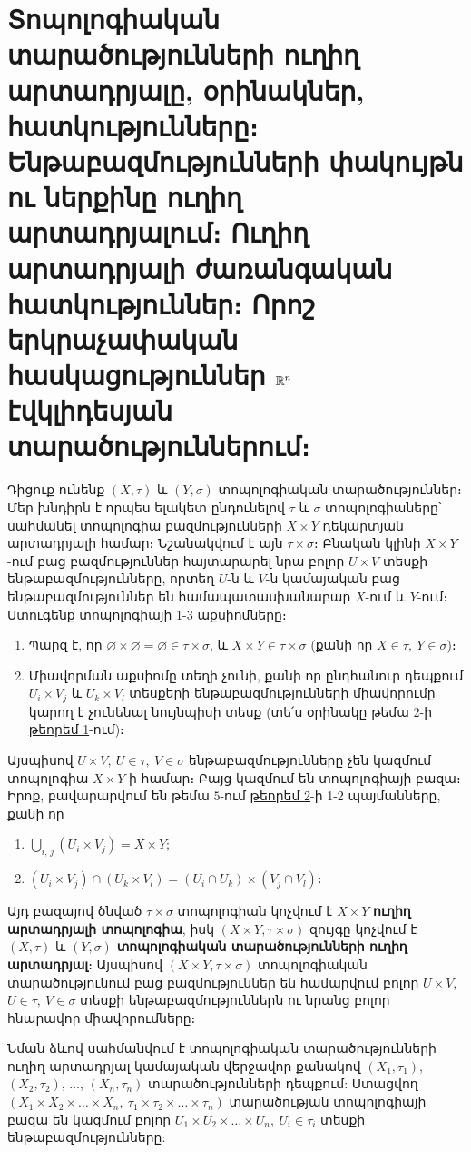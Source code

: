 \documentclass[./main.tex]{subfiles}
\begin{document}
\onehalfspacing
\section{Տոպոլոգիական տարածությունների ուղիղ արտադրյալը, օրինակներ, հատկությունները։ Ենթաբազմությունների փակույթն ու ներքինը ուղիղ արտադրյալում։ Ուղիղ արտադրյալի ժառանգական հատկություններ։ Որոշ երկրաչափական հասկացություններ $\mathbb{R}^n$ էվկլիդեսյան տարա\-ծու\-թյուն\-նե\-րում։}\label{sec:13}

\par Դիցուք ունենք $(X,\tau)$ և $(Y,\sigma)$ տոպոլոգիական տարածություններ։ Մեր խնդիրն է որ\-պես ելակետ ընդունելով $\tau$ և $\sigma$ տոպոլոգիաները՝ սահմանել տոպոլոգիա բազ\-մու\-թյուն\-նե\-րի $X\times Y$ դե\-կարտ\-յան արտադրյալի համար։ Նշանակվում է այն $\tau \times \sigma$։ Բնա\-կան կլինի $X\times Y$-ում բաց բազ\-մութ\-յուն\-ներ հայտարարել նրա բոլոր $U \times V$ տեսքի ենթա\-բազ\-մու\-թյուն\-նե\-րը, որտեղ $U$-ն և $V$-ն կամայական բաց ենթաբազմություններ են համա\-պատասխանաբար $X$-ում և $Y$-ում։ Ստուգենք տո\-պո\-լո\-գիա\-յի 1-3 աքսիոմ\-նե\-րը։
\begin{enumerate}
    \item Պարզ է, որ $\varnothing \times \varnothing =\varnothing \in \tau \times \sigma$, և $X \times Y \in \tau \times \sigma$ (քանի որ $X\in \tau,\ Y\in \sigma$)։
    \item Միավորման աքսիոմը տեղի չունի, քանի որ ընդհանուր դեպքում $U_i\times V_j$ և $U_k\times V_l$ տեսքերի ենթաբազմությունների միավորումը կարող է չունենալ նույն\-պի\-սի տեսք (տե՛ս օրինակը թեմա 2-ի \hyperref[ch2thm1]{թեորեմ 1}-ում)։
\end{enumerate}
\par Այսպիսով $U \times V,\ U \in \tau,\ V \in \sigma$ ենթաբազմությունները չեն կազմում տոպոլոգիա $X\times Y$-ի համար։ Բայց կազմում են տոպոլոգիայի բազա։ Իրոք, բավարարվում են թեմա $5$-ում \hyperref[ch5thm2]{թեորեմ 2}-ի 1-2 պայմանները, քանի որ
\begin{enumerate}
    \item $\bigcup\limits_{i,\, j}(U_i\times V_j)=X\times Y$;
    \item $(U_i\times V_j )\cap(U_k\times V_l)=(U_i\cap U_k)\times (V_j\cap V_l)$։
\end{enumerate}
\par Այդ բազայով ծնված $\tau \times \sigma$ տոպոլոգիան կոչվում է $X \times Y$ \textbf{ուղիղ արտադրյալի տոպոլոգիա}, իսկ $(X\times Y, \tau \times \sigma)$ զույգը կոչվում է $(X,\tau)$ և $(Y,\sigma)$ \textbf{տոպոլոգիական տարածությունների ուղիղ արտադրյալ}։ Այսպիսով $(X\times Y, \tau \times \sigma)$ տոպոլոգիական տարածությունում բաց բազմություններ են համարվում բոլոր $U \times V$, $U\in \tau,\ V \in \sigma$ տեսքի ենթա\-բազ\-մութ\-յուններն ու նրանց բոլոր հնարավոր միավորումները։
\par Նման ձևով սահմանվում է տոպոլոգիական տարածությունների ուղիղ ար\-տա\-դրյալ կամայական վերջավոր քանակով $(X_1,\tau_1)$, $(X_2,\tau_2)$, $\dots$, $(X_n,\tau_n)$ տարածու\-թ\-յուն\-ների դեպքում: Ստացվող $(X_1\times X_2\times\dots\times X_n,\ \tau_1\times\tau_2\times\dots\times\tau_n)$  տարա\-ծու\-թյան տոպոլոգիայի բազա են կազմում բոլոր $U_1\times U_2\times\dots\times U_n,\ 
U_i\in\tau_i$ տեսքի են\-թա\-բազ\-մութ\-յունները:
\end{document}

